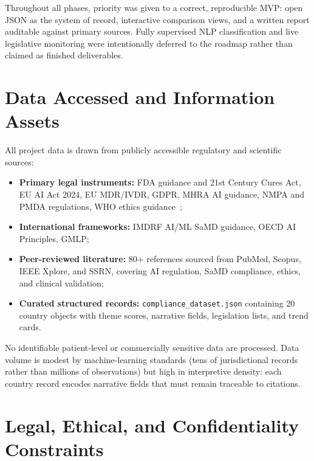 Throughout all phases, priority was given to a correct, reproducible MVP: open JSON
as the system of record, interactive comparison views, and a written report auditable
against primary sources. Fully supervised NLP classification and live legislative
monitoring were intentionally deferred to the roadmap rather than claimed as finished
deliverables.

\section{Data Accessed and Information Assets}
\label{sec:data}

All project data is drawn from publicly accessible regulatory and scientific sources:

\begin{itemize}[noitemsep]
  \item \textbf{Primary legal instruments:} FDA guidance and 21st Century Cures Act,
        EU AI Act 2024, EU MDR/IVDR, GDPR, MHRA AI guidance, NMPA and PMDA
        regulations, WHO ethics guidance~\cite{fda2021,euaiact2024,who2021};
  \item \textbf{International frameworks:} IMDRF AI/ML SaMD guidance, OECD AI
        Principles, GMLP;
  \item \textbf{Peer-reviewed literature:} 80+ references sourced from PubMed,
        Scopus, IEEE Xplore, and SSRN, covering AI regulation, SaMD compliance,
        ethics, and clinical validation;
  \item \textbf{Curated structured records:} \texttt{compliance\_dataset.json}
        containing 20 country objects with theme scores, narrative fields, legislation
        lists, and trend cards.
\end{itemize}

No identifiable patient-level or commercially sensitive data are processed. Data volume
is modest by machine-learning standards (tens of jurisdictional records rather than
millions of observations) but high in interpretive density: each country record encodes
narrative fields that must remain traceable to citations.

\section{Legal, Ethical, and Confidentiality Constraints}
\label{sec:legal}

